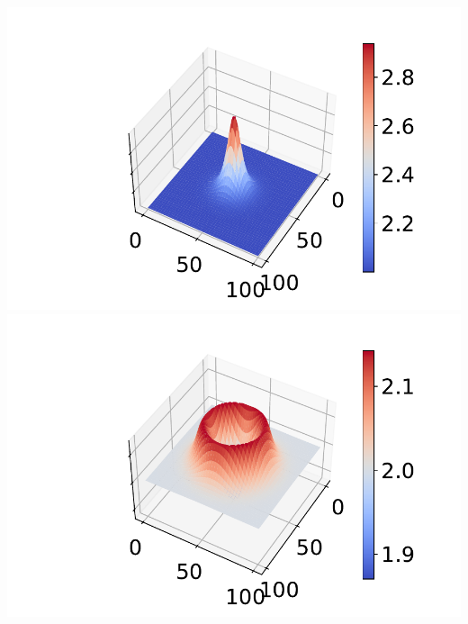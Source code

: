 \documentclass[
11pt, %
francais, %
singlespacing, %
headsepline, %
f%
]{MastersDoctoralThesis} %
\theoremstyle{definition}
\begin{document}
\begin{center}
\includegraphics[scale = 0.6]{goutte2D0}
\includegraphics[scale = 0.6]{goutte2D1} 
\end{center}
\end{document}
